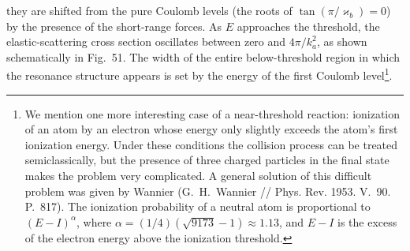 they are shifted from the pure Coulomb levels (the roots of $\tan(\pi/\varkappa_b)=0$) by the presence of the short-range forces. As $E$ approaches the threshold, the elastic-scattering cross section oscillates between zero and $4\pi/k_a^2$, as shown schematically in Fig.~51. The width of the entire below-threshold region in which the resonance structure appears is set by the energy of the first Coulomb level\footnote{We mention one more interesting case of a near-threshold reaction: ionization of an atom by an electron whose energy only slightly exceeds the atom's first ionization energy. Under these conditions the collision process can be treated semiclassically, but the presence of three charged particles in the final state makes the problem very complicated. A general solution of this difficult problem was given by Wannier (G.~H.~Wannier // Phys. Rev. 1953. V.~90. P.~817). The ionization probability of a neutral atom is proportional to $(E-I)^\alpha$, where $\alpha=(1/4)(\sqrt{9173}-1)\approx1{.}13$, and $E-I$ is the excess of the electron energy above the ionization threshold.}.

\begin{figure}[tbp]
\centering
{}
\caption{}
\end{figure}
